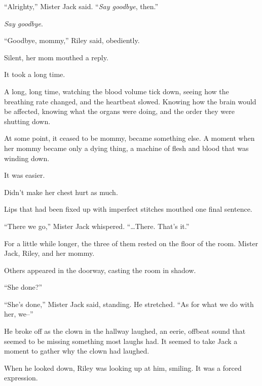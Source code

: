 ``Alrighty,'' Mister Jack said.  ``\emph{Say goodbye}, then.''



\emph{Say goodbye}.



``Goodbye, mommy,'' Riley said, obediently.



Silent, her mom mouthed a reply.



It took a long time.



A long, long time, watching the blood volume tick down, seeing how the breathing rate changed, and the heartbeat slowed.  Knowing how the brain would be affected, knowing what the organs were doing, and the order they were shutting down.



At some point, it ceased to be mommy, became something else.  A moment when her mommy became only a dying thing, a machine of flesh and blood that was winding down.



It was easier.



Didn't make her chest hurt as much.



Lips that had been fixed up with imperfect stitches mouthed one final sentence.



``There we go,'' Mister Jack whispered.  ``\ldots{}There.  That's it.''



For a little while longer, the three of them rested on the floor of the room.  Mister Jack, Riley, and her mommy.



Others appeared in the doorway, casting the room in shadow.



``She done?''



``She's done,'' Mister Jack said, standing.  He stretched.  ``As for what we do with her, we--''



He broke off as the clown in the hallway laughed, an eerie, offbeat sound that seemed to be missing something most laughs had.  It seemed to take Jack a moment to gather why the clown had laughed.



When he looked down, Riley was looking up at him, smiling.  It was a forced expression.




